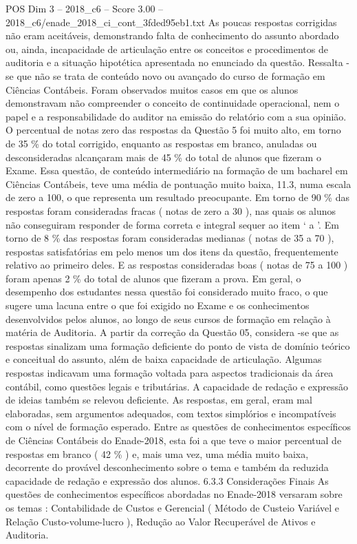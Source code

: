 \begin{textsample}{POS Dim 3 – 2018\_c6 – Score 3.00 – 2018\_c6/enade\_2018\_ci\_cont\_3fded95eb1.txt}
As poucas respostas corrigidas não eram aceitáveis, demonstrando falta de conhecimento do assunto abordado ou, ainda, incapacidade de articulação entre os conceitos e procedimentos de auditoria e a situação hipotética apresentada no enunciado da questão.
Ressalta -se que não se trata de conteúdo novo ou avançado do curso de formação em Ciências Contábeis.
Foram observados muitos casos em que os alunos demonstravam não compreender o conceito de continuidade operacional, nem o papel e a responsabilidade do auditor na emissão do relatório com a sua opinião.
O percentual de notas zero das respostas da Questão 5 foi muito alto, em torno de 35 \% do total corrigido, enquanto as respostas em branco, anuladas ou desconsideradas alcançaram mais de 45 \% do total de alunos que fizeram o Exame.
Essa questão, de conteúdo intermediário na formação de um bacharel em Ciências Contábeis, teve uma média de pontuação muito baixa, 11.3, numa escala de zero a 100, o que representa um resultado preocupante.
Em torno de 90 \% das respostas foram consideradas fracas ( notas de zero a 30 ), nas quais os alunos não conseguiram responder de forma correta e integral sequer ao item ‘ a ’.
Em torno de 8 \% das respostas foram consideradas medianas ( notas de 35 a 70 ), respostas satisfatórias em pelo menos um dos itens da questão, frequentemente relativo ao primeiro deles.
E as respostas consideradas boas ( notas de 75 a 100 ) foram apenas 2 \% do total de alunos que fizeram a prova.
Em geral, o desempenho dos estudantes nessa questão foi considerado muito fraco, o que sugere uma lacuna entre o que foi exigido no Exame e os conhecimentos desenvolvidos pelos alunos, ao longo de seus cursos de formação em relação à matéria de Auditoria.
A partir da correção da Questão 05, considera -se que as respostas sinalizam uma formação deficiente do ponto de vista de domínio teórico e conceitual do assunto, além de baixa capacidade de articulação.
Algumas respostas indicavam uma formação voltada para aspectos tradicionais da área contábil, como questões legais e tributárias.
A capacidade de redação e expressão de ideias também se relevou deficiente.
As respostas, em geral, eram mal elaboradas, sem argumentos adequados, com textos simplórios e incompatíveis com o nível de formação esperado.
Entre as questões de conhecimentos específicos de Ciências Contábeis do Enade-2018, esta foi a que teve o maior percentual de respostas em branco ( 42 \% ) e, mais uma vez, uma média muito baixa, decorrente do provável desconhecimento sobre o tema e também da reduzida capacidade de redação e expressão dos alunos. 6.3.3 Considerações Finais As questões de conhecimentos específicos abordadas no Enade-2018 versaram sobre os temas : Contabilidade de Custos e Gerencial ( Método de Custeio Variável e Relação Custo-volume-lucro ), Redução ao Valor Recuperável de Ativos e Auditoria.

\end{textsample}
